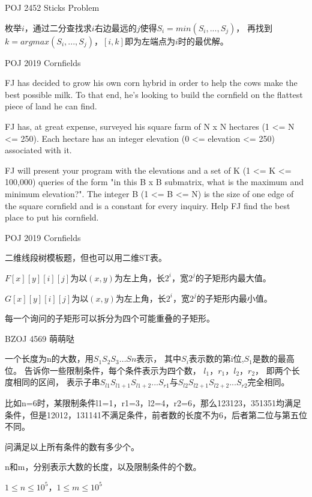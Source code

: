 \documentclass{beamer}
\begin{document}
\begin{frame}{POJ 2452 Sticks Problem}

    枚举$i$，通过二分查找求$i$右边最远的$j$使得$S_i=min(S_i,...,S_j)$，
    再找到$k=argmax(S_i,...,S_j)$，$[i,k]$即为左端点为$i$时的最优解。

\end{frame}

\begin{frame}{POJ 2019 Cornfields}
    
    FJ has decided to grow his own corn hybrid in order to help the cows make the best possible milk. To that end, he's looking to build the cornfield on the flattest piece of land he can find. 

    FJ has, at great expense, surveyed his square farm of N x N hectares (1 <= N <= 250). Each hectare has an integer elevation (0 <= elevation <= 250) associated with it. 

    FJ will present your program with the elevations and a set of K (1 <= K <= 100,000) queries of the form "in this B x B submatrix, what is the maximum and minimum elevation?". The integer B (1 <= B <= N) is the size of one edge of the square cornfield and is a constant for every inquiry. Help FJ find the best place to put his cornfield. 

\end{frame}

\begin{frame}{POJ 2019 Cornfields}
    
    二维线段树模板题，但也可以用二维ST表。

    $F[x][y][i][j]$为以$(x,y)$为左上角，长$2^i$，宽$2^j$的子矩形内最大值。

    $G[x][y][i][j]$为以$(x,y)$为左上角，长$2^i$，宽$2^j$的子矩形内最小值。

    每一个询问的子矩形可以拆分为四个可能重叠的子矩形。

\end{frame}

\begin{frame}{BZOJ 4569 萌萌哒}

    一个长度为n的大数，用$S_1S_2S_3\ldots Sn$表示，
    其中$S_i$表示数的第i位,$S_1$是数的最高位。
    告诉你一些限制条件，每个条件表示为四个数，
    $l_1，r_1，l_2，r_2$，
    即两个长度相同的区间，
    表示子串$S_{l1}S_{l1+1}S_{l1+2}...S_{r1}$与$S_{l2}S_{l2+1}S_{l2+2}...S_{r2}$完全相同。
    
    比如n=6时，某限制条件l1=1，r1=3，l2=4，r2=6，那么123123，351351均满足条件，但是12012，131141不满足条件，前者数的长度不为6，后者第二位与第五位不同。
    
    问满足以上所有条件的数有多少个。
    
    n和m，分别表示大数的长度，以及限制条件的个数。
    
    $1 \leq n \leq 10^5，1 \leq m \leq 10^5$

\end{frame}
\end{document}
